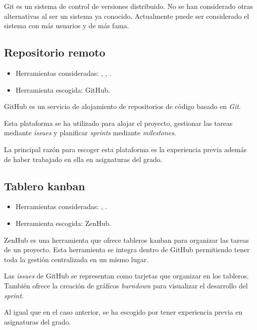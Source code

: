 Git es un sistema de control de versiones distribuido. No se han considerado
otras alternativas al ser un sistema ya conocido. Actualmente puede ser
considerado el sistema con más usuarios y de más fama.

\subsection{Repositorio remoto}

\begin{itemize}
	\tightlist
	\item Herramientas consideradas: ,
	,
	.
	\item Herramienta escogida: GitHub.
\end{itemize}

GitHub es un servicio de alojamiento de repositorios de código basado en
\textit{Git}.

Esta plataforma se ha utilizado para alojar el proyecto, gestionar las tareas
mediante \textit{issues} y planificar \textit{sprints} mediante
\textit{milestones}.

La principal razón para escoger esta plataforma es la experiencia previa además
de haber trabajado en ella en asignaturas del grado.

\subsection{Tablero kanban}

\begin{itemize}
	\tightlist
	\item Herramientas consideradas:
	,
	.
	\item Herramienta escogida: ZenHub.
\end{itemize}

ZenHub es una herramienta que ofrece tableros kanban para organizar las tareas
de un proyecto. Esta herramienta se integra dentro de GitHub permitiendo tener
toda la gestión centralizada en un mismo lugar.

Las \textit{issues} de GitHub se representan como tarjetas que organizar en los
tableros. También ofrece la creación de gráficos \textit{burndown} para
visualizar el desarrollo del \textit{sprint}. 

Al igual que en el caso anterior, se ha escogido por tener experiencia previa en
asignaturas del grado.

